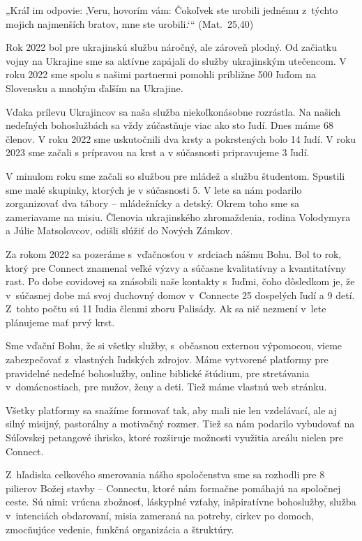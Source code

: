 „Kráľ im odpovie: ‚Veru, hovorím vám: Čokoľvek ste urobili jednému z~týchto mojich najmenších bratov, mne ste urobili.‘“ (Mat.~25,40)




Rok 2022 bol pre ukrajinskú službu náročný, ale zároveň plodný. Od začiatku vojny na Ukrajine sme sa aktívne zapájali do služby ukrajinským utečencom. V roku 2022 sme spolu s našimi partnermi pomohli približne 500 ľuďom na Slovensku a mnohým ďalším na Ukrajine.

Vďaka prílevu Ukrajincov sa naša služba niekoľkonásobne rozrástla. Na našich nedeľných bohoslužbách sa vždy zúčastňuje viac ako sto ľudí. Dnes máme 68 členov. V roku 2022 sme uskutočnili dva krsty a pokrstených bolo 14 ľudí. V roku 2023 sme začali s prípravou na krst a v súčasnosti pripravujeme 3 ľudí.

V minulom roku sme začali so službou pre mládež a službu študentom. Spustili sme malé skupinky, ktorých je v súčasnosti 5. V lete sa nám podarilo zorganizovať dva tábory -- mládežnícky a detský. Okrem toho sme sa zameriavame na misiu. Členovia ukrajinského zhromaždenia, rodina Volodymyra a Júlie Matsolovcov, odišli slúžiť do Nových Zámkov.

\vfill\break



Za rokom 2022 sa pozeráme s~vďačnosťou v~srdciach nášmu Bohu. Bol to rok, ktorý pre Connect znamenal veľké výzvy a súčasne kvalitatívny a kvantitatívny rast.
Po dobe covidovej sa znásobili naše kontakty s~ľuďmi, čoho dôsledkom je, že v~súčasnej dobe má svoj duchovný domov v~Connecte 25 dospelých ľudí a 9 detí. Z~tohto počtu sú 11 ľudia členmi zboru Palisády. Ak sa nič nezmení v~lete plánujeme mať prvý krst.

Sme vďační Bohu, že si všetky služby, s~občasnou externou výpomocou, vieme zabezpečovať z~vlastných ľudských zdrojov. Máme vytvorené platformy pre pravidelné nedeľné bohoslužby, online biblické štúdium, pre stretávania v~domácnostiach, pre mužov, ženy a deti. Tiež máme vlastnú web stránku.

Všetky platformy sa snažíme formovať tak, aby mali nie len vzdelávací, ale aj silný misijný, pastorálny a motivačný rozmer. Tiež sa nám podarilo vybudovať na Súľovskej petangové ihrisko, ktoré rozširuje možnosti využitia areálu nielen pre Connect.

Z~hľadiska celkového smerovania nášho spoločenstva sme sa rozhodli pre 8 pilierov Božej stavby – Connectu, ktoré nám formačne pomáhajú na spoločnej ceste. Sú nimi:
vrúcna zbožnosť, láskyplné vzťahy, inšpiratívne bohoslužby, služba v~intenciách obdarovaní, misia zameraná na potreby, cirkev po domoch, zmocňujúce vedenie, funkčná organizácia a štruktúry.

